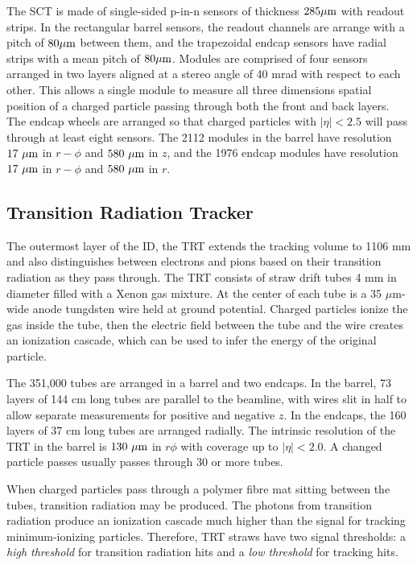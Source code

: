 The SCT is made of single-sided p-in-n sensors of thickness $285 \mu \textrm{m}$ with readout strips. In the rectangular barrel sensors, the readout channels are arrange with a pitch of $80 \mu \textrm{m}$ between them, and the trapezoidal endcap sensors have radial strips with a mean pitch of  $80 \mu \textrm{m}$.  Modules are comprised of four sensors arranged in two layers aligned at a stereo angle of 40 mrad with respect to each other. This allows a single module to measure all three dimensions spatial position of a charged particle passing through both the front and back layers. The endcap wheels are arranged so that charged particles with $|\eta|<2.5$ will pass through at least eight sensors. The 2112 modules in the barrel have resolution $17\ \mu \textrm{m}$ in $r-\phi$ and $580\ \mu \textrm{m}$ in $z$, and the 1976 endcap modules have resolution $17\ \mu \textrm{m}$ in $r-\phi$ and $580\ \mu \textrm{m}$ in $r$.

\subsection{Transition Radiation Tracker}
The outermost layer of the ID, the TRT extends the tracking volume to 1106 mm and also distinguishes between electrons and pions based on their transition radiation as they pass through. The TRT consists of straw drift tubes 4 mm in diameter filled with a Xenon gas mixture. At the center of each tube is a 35 $\mu$m-wide anode tungdsten wire held at ground potential. Charged particles ionize the gas inside the tube, then the electric field between the tube and the wire creates an ionization cascade, which can be used to infer the energy of the original particle.

The 351,000 tubes are arranged in a barrel and two endcaps. In the barrel, 73 layers of 144 cm long tubes are parallel to the beamline, with wires slit in half to allow separate measurements for positive and negative $z$. In the endcaps, the 160 layers of 37 cm long tubes are arranged radially.  The intrinsic resolution of the TRT in the barrel is $130\ \mu \textrm{m}$ in $r\phi$ with coverage up to $|\eta|<2.0$. A changed particle passes usually passes through 30 or more tubes.

When charged particles pass through a polymer fibre mat sitting between the tubes, transition radiation may be produced. The photons from transition radiation produce an ionization cascade much higher than the signal for tracking minimum-ionizing particles. Therefore, TRT straws have two signal thresholds: a \emph{high threshold} for transition radiation hits and a \emph{low threshold} for tracking hits. 

